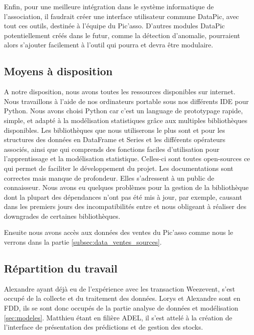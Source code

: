 Enfin, pour une meilleure intégration dans le système informatique de l’association, il faudrait créer une interface utilisateur commune DataPic, avec tout ces outils, destinée à l’équipe du Pic’asso. D’autres modules DataPic potentiellement créés dans le futur, comme la détection d’anomalie, pourraient alors s’ajouter facilement à l'outil qui pourra et devra être modulaire.

\subsection{Moyens à disposition}
\label{subsec:intro_moyens}

A notre disposition, nous avons toutes les ressources disponibles sur internet. Nous travaillons à l'aide de nos ordinateurs portable sous nos différents IDE pour Python. Nous avons choisi Python car c'est un language de prototypage rapide, simple, et adapté à la modélisation statistiques grâce aux multiples bibliothèques disponibles. Les bibliothèques que nous utiliserons le plus sont  et  pour les structures des données en DataFrame et Series et les différents opérateurs associés, ainsi que  qui comprends des fonctions faciles d'utilisation pour l'apprentissage et la modélisation statistique. Celles-ci sont toutes open-sources ce qui permet de faciliter le développement du projet. Les documentations sont correctes mais manque de profondeur. Elles s'adressent à un public de connaisseur. Nous avons eu quelques problèmes pour la gestion de la bibliothèque  dont la plupart des dépendances n'ont pas été mis à jour, par exemple, causant dans les premiers jours des incompatibilités entre  et  nous obligeant à réaliser des downgrades de certaines bibliothèques.

Ensuite nous avons accès aux données des ventes du Pic'asso comme nous le verrons dans la partie \ref{subsec:data_ventes_sources}.


\subsection{Répartition du travail}
\label{subsec:work_share}

Alexandre ayant déjà eu de l'expérience avec les transaction Weezevent, s'est occupé de la collecte et du traitement des données. Lorys et Alexandre sont en FDD, ils se sont donc occupés de la partie analyse de données et modélisation \ref{sec:modeles}. 
Matthieu étant en filière ADEL, il s'est attelé à la création de l'interface de présentation des prédictions et de gestion des stocks.


